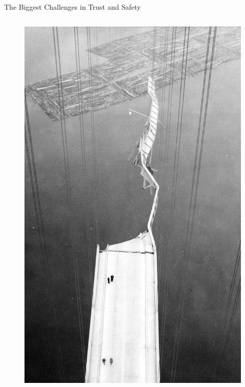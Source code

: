 \documentclass[nobackground,dvipsnames,table]{beamer}
\begin{document}
\begin{frame}{}
    \thispagestyle{empty}
\end{frame}

\begin{frame}{}
    \thispagestyle{empty}
\end{frame}

\begin{frame}{The Biggest Challenges in Trust and Safety}
        \begin{columns}
                \begin{figure}
                    \centering
                    \includegraphics[width=\textwidth]{broken-bridge.png}

\end{figure}
\end{columns}
\end{frame}
\end{document}
